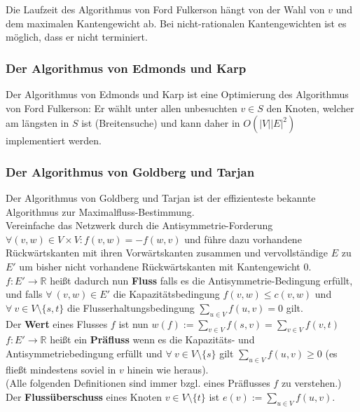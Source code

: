 \documentclass[a4paper,10pt]{scrartcl}
\newcommand{\tbf}{\textbf}
\newcommand{\Flue}{$f: E' \rightarrow \mathbb{R}$ }
\begin{document}
Die Laufzeit des Algorithmus von Ford Fulkerson hängt von der Wahl von $v$ und dem maximalen Kantengewicht ab. Bei nicht-rationalen Kantengewichten ist es möglich, dass er nicht terminiert.


\subsubsection{Der Algorithmus von Edmonds und Karp}
Der Algorithmus von Edmonds und Karp ist eine Optimierung des Algorithmus von Ford Fulkerson: Er wählt unter allen unbesuchten $v \in S$ den Knoten, welcher am längsten in $S$ ist (Breitensuche) und kann daher in $O(|V||E|^2)$ implementiert werden.


\subsubsection{Der Algorithmus von \textsf{Goldberg} und \textsf{Tarjan}}
Der Algorithmus von \textsf{Goldberg} und \textsf{Tarjan} ist der effizienteste bekannte Algorithmus zur Maximalfluss-Bestimmung. \\

Vereinfache das Netzwerk durch die Antisymmetrie-Forderung $\forall (v,w) \in V\times V: f(v,w) = - f(w,v)$ und führe dazu vorhandene Rückwärtskanten mit ihren Vorwärtskanten zusammen und vervollständige $E$ zu $E'$ um bisher nicht vorhandene Rückwärtskanten mit Kantengewicht $0$. \\

\Flue heißt dadurch nun \tbf{Fluss} falls es die Antisymmetrie-Bedingung erfüllt, und falls $\forall \ (v,w) \in E'$ die Kapazitätsbedingung $f(v,w) \leq c(v,w)$ und $\forall \ v \in V \setminus \{s,t\}$ die Flusserhaltungsbedingung $\sum_{u \in V} \limits f(u,v) = 0$ gilt. \\

Der \tbf{Wert} eines Flusses $f$ ist nun $w(f) := \sum_{v \in V} \limits f(s,v) = \sum_{v \in V} \limits f(v,t)$ \\

\Flue heißt ein \tbf{Präfluss} wenn es die Kapazitäts- und Antisymmetriebedingung erfüllt und $\forall \ v \in V \setminus \{s\}$ gilt $\sum_{u \in V} \limits f(u,v) \geq 0$ (es fließt mindestens soviel in $v$ hinein wie heraus). \\

(Alle folgenden Definitionen sind immer bzgl. eines Präflusses $f$ zu verstehen.) \\

Der \tbf{Flussüberschuss} eines Knoten $v \in V \setminus \{t\}$ ist $e(v) := \sum_{u \in V} \limits f(u,v)$. \\
\end{document}
